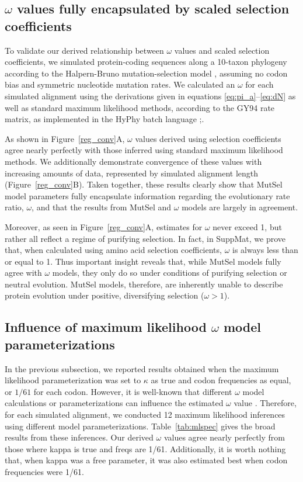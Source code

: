 \documentclass[11pt]{article}
\begin{document}
\subsection*{$\omega$ values fully encapsulated by scaled selection coefficients}

To validate our derived relationship between $\omega$ values and scaled selection coefficients, we simulated protein-coding sequences along a 10-taxon phylogeny according to the Halpern-Bruno mutation-selection model \cite{HalpernBruno1998}, assuming no codon bias and symmetric nucleotide mutation rates. We calculated an $\omega$ for each simulated alignment using the derivations given in equations \eqref{eq:pi_a}--\eqref{eq:dN} as well as standard maximum likelihood methods, according to the GY94 \cite{GoldmanYang1994} rate matrix, as implemented in the HyPhy batch language \cite{KosakovskyPondetal2005};.

As shown in Figure~\ref{reg_conv}A, $\omega$ values derived using selection coefficients agree nearly perfectly with those inferred using standard maximum likelihood methods. We additionally demonstrate convergence of these values with increasing amounts of data, represented by simulated alignment length (Figure~\ref{reg_conv}B). Taken together, these results clearly show that MutSel model parameters fully encapsulate information regarding the evolutionary rate ratio, $\omega$, and that the results from MutSel and $\omega$ models are largely in agreement. 

Moreover, as seen in Figure~\ref{reg_conv}A, estimates for $\omega$ never exceed 1, but rather all reflect a regime of purifying selection. In fact, in SuppMat, we prove that, when calculated using amino acid selection coefficients, $\omega$ is always less than or equal to 1. Thus important insight reveals that, while MutSel models fully agree with $\omega$ models, they only do so under conditions of purifying selection or neutral evolution. MutSel models, therefore, are inherently unable to describe protein evolution under positive, diversifying selection ($\omega > 1$).



\subsection*{Influence of maximum likelihood $\omega$ model parameterizations}

In the previous subsection, we reported results obtained when the maximum likelihood parameterization was set to $\kappa$ as true and codon frequencies as equal, or $1/61$ for each codon. However, it is well-known that different $\omega$ model calculations or parameterizations can influence the estimated $\omega$ value \cite{YN00,Yang2006,ZhangYu2006}. Therefore, for each simulated alignment, we conducted 12 maximum likelihood inferences using different model parameterizations. Table~\ref{tab:mlspec} gives the broad results from these inferences. Our derived $\omega$ values agree nearly perfectly from those where kappa is true and freqs are 1/61. Additionally, it is worth nothing that, when kappa was a free parameter, it was also estimated best when codon frequencies were 1/61.
\end{document}
